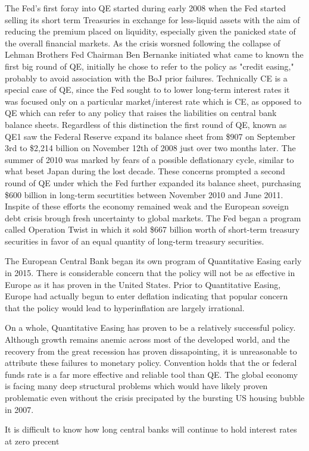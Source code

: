 \documentclass[12pt]{report}
\begin{document}
The Fed's first foray into QE started during early 2008 when the Fed started selling its short term Treasuries in exchange for less-liquid assets with the aim of reducing the premium placed on liquidity, especially given the panicked state of the overall financial markets.\autocite[467]{blinder2010quantitative}
As the crisis worsned following the collapse of Lehman Brothers Fed Chairman Ben Bernanke initiated what came to known the first big round of QE, initially he chose to refer to the policy as "credit easing," probably to avoid association with the BoJ prior failures.\autocite[465]{blinder2010quantitative}
Technically CE is a special case of QE, since the Fed sought to to lower long-term interest rates it was focused only on a particular market/interest rate which is CE, as opposed to QE which can refer to any policy that raises the liabilities on central bank balance sheets.\autocite[55]{fawley2013four}
Regardless of this distinction the first round of QE, known as QE1 saw the Federal Reserve expand its balance sheet from \$907 on September 3rd to \$2,214 billion on November 12th of 2008 just over two months later.\autocite[468]{blinder2010quantitative}
The summer of 2010 was marked by fears of a possible deflationary cycle, similar to what beset Japan during the lost decade.\autocite[1]{ricketts2014rise}
These concerns prompted a second round of QE under which the Fed further expanded its balance sheet, purchasing \$600 billion in long-term securtities between November 2010 and June 2011.\autocite[1]{ricketts2014rise}
Inspite of these efforts the economy remained weak and the European soveign debt crisis brough fresh uncertainty to global markets.
The Fed began a program called Operation Twist in which it sold \$667 billion worth of short-term treasury securities in favor of an equal quantity of long-term treasury securities.\autocite[1]{ricketts2014rise}

The European Central Bank began its own program of Quantitative Easing early in 2015.\autocite{economistQEGermany}
There is considerable concern that the policy will not be as effective in Europe as it has proven in the United States.\autocite{economistQEGermany}
Prior to Quantitative Easing, Europe had actually begun to enter deflation indicating that popular concern that the policy would lead to hyperinflation are largely irrational.\autocite{economistQEGermany}
\autocite{economistQEGermany}


On a whole, Quantitative Easing has proven to be a relatively successful policy.
Although growth remains anemic across most of the developed world, and the recovery from the great recession has proven dissapointing, it is unreasonable to attribute these failures to monetary policy.
Convention holds that the or federal funds rate is a far more effective and reliable tool than QE.\autocite[465]{blinder2010quantitative}
The global economy is facing many deep structural problems which would have likely proven problematic even without the crisis precipated by the bursting US housing bubble in 2007.

It is difficult to know how long central banks will continue to hold interest rates at zero precent

\begin{appendices}


\end{appendices}

\nocite{*}
\printbibliography
\end{document}

